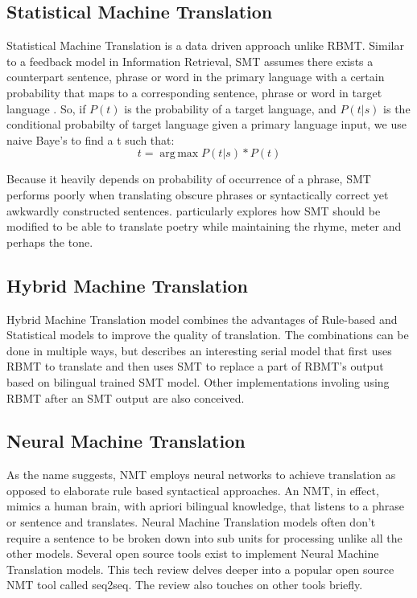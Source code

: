 \documentclass[twocolumn,10pt]{article}
\DeclareMathOperator*{\argmax}{arg\,max}
\begin{document}
\subsection{Statistical Machine Translation}
Statistical Machine Translation is a data driven approach unlike RBMT. Similar to a feedback model in Information Retrieval, SMT assumes there exists a counterpart sentence, phrase or word in the primary language with a certain probability that maps to a corresponding sentence, phrase or word in target language\cite{kit} . So, if \(P(t)\) is the probability of a target language, and \(P(t|s)\) is the conditional probabilty of target language given a primary language input, we use naive Baye's to find a t such that: \[t=\argmax P(t|s)*P(t)\]
\par
Because it heavily depends on probability of occurrence of a phrase, SMT performs poorly when translating obscure phrases or syntactically correct yet awkwardly constructed sentences. \cite{genzel} particularly explores how SMT should be modified to be able to translate poetry while maintaining the rhyme, meter and perhaps the tone. 
\subsection{Hybrid Machine Translation}
Hybrid Machine Translation model combines the advantages of Rule-based and Statistical models to improve the quality of translation. The combinations can be done in multiple ways, but \cite{xuan} describes an interesting serial model that first uses RBMT to translate and then uses SMT to replace a part of RBMT's output based on bilingual trained SMT model. Other implementations involing using RBMT after an SMT output are also conceived.  
\subsection{Neural Machine Translation}
As the name suggests, NMT employs neural networks to achieve translation as opposed to elaborate rule based syntactical approaches. An NMT, in effect, mimics a human brain, with apriori bilingual knowledge, that listens to a phrase or sentence and translates. Neural Machine Translation models often don't require a sentence to be broken down into sub units for processing unlike all the other models. Several open source tools exist to implement Neural Machine Translation models. This tech review delves deeper into a popular open source NMT tool called seq2seq. The review also touches on other tools briefly.
\end{document}
